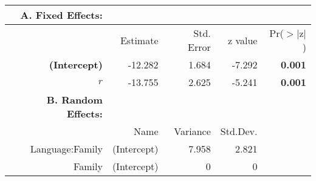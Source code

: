\begin{tabular}{rrrrr}
 {\bf A. Fixed Effects:} \\
\hline
 & Estimate & Std. Error & z value & Pr($>$$|$z$|$) \\ 
  \hline
 {\bf (Intercept)} & -12.282 & 1.684 & -7.292 & {\bf 0.001} \\ 
  {\bf $r$} & -13.755 & 2.625 & -5.241 & {\bf 0.001} \\ 

\hline \hline
{\bf B. Random Effects:} \\
\hline
& Name & Variance & Std.Dev. \\
\hline
Language:Family & (Intercept) & 7.958 & 2.821 \\
Family & (Intercept) & 0 & 0 \\
\end{tabular}
